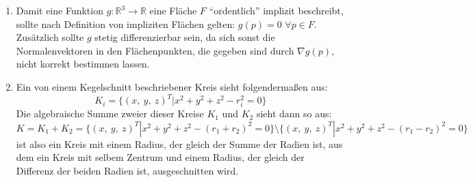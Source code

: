 \documentclass[a4paper,10pt]{scrartcl}
\begin{document}
\vspace*{5pt}
\begin{enumerate}[1.]

\item Damit eine Funktion $g: \mathbb{R}^3 \rightarrow \mathbb{R}$  eine Fläche $F$ ``ordentlich'' implizit beschreibt, sollte nach Definition von impliziten Flächen gelten: $g(p) = 0$ $\forall p \in F$. Zusätzlich sollte $g$ stetig differenzierbar sein, da sich sonst die Normalenvektoren in den Flächenpunkten, die gegeben sind durch $\nabla g(p)$, nicht korrekt bestimmen lassen.

\item Ein von einem Kegelschnitt beschriebener Kreis sieht folgenderma\ss en aus:
$$K_i = \{ (x,~ y,~ z)^T | x^2 + y^2 + z^2 - r_i^2 = 0 \}$$
Die algebraische Summe zweier dieser Kreise $K_1$ und $K_2$ sieht dann so aus:
$$K = K_1 + K_2 = \{ (x,~ y,~ z)^T | x^2 + y^2 + z^2 - (r_1 + r_2)^2 = 0 \} \setminus \{ (x,~ y,~ z)^T | x^2 + y^2 + z^2 - (r_1 - r_2)^2 = 0 \}$$
ist also ein Kreis mit einem Radius, der gleich der Summe der Radien ist, aus dem ein Kreis mit selbem Zentrum und einem Radius, der gleich der Differenz der beiden Radien ist, ausgeschnitten wird.


\end{enumerate}
\end{document}
